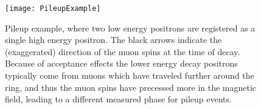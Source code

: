 

\begin{figure}
    \centering
    \texttt{[image: PileupExample]}
    \caption[Pileup example]{Pileup example, where two low energy positrons are registered as a single high energy positron. The black arrows indicate the (exaggerated) direction of the muon spins at the time of decay. Because of acceptance effects the lower energy decay positrons typically come from muons which have traveled further around the ring, and thus the muon spins have precessed more in the magnetic field, leading to a different measured \gmtwo phase for pileup events.}
    \label{fig:PileupExample}
\end{figure}


